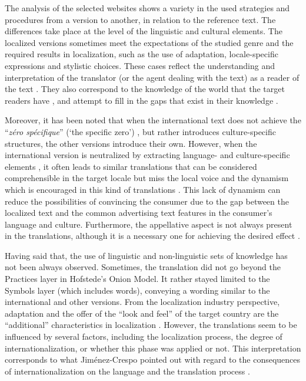 \documentclass[output=paper]{langsci/langscibook}
\begin{document}
The analysis of the selected websites shows a variety in the used strategies and procedures from a version to another, in relation to the reference text. The differences take place at the level of the linguistic and cultural elements. The localized versions sometimes meet the expectations of the studied genre and the required results in localization, such as the use of adaptation, locale-specific expressions and stylistic choices. These cases reflect the understanding and interpretation of the translator (or the agent dealing with the text) as a reader of the text \parencite{plassard07}. They also correspond to the knowledge of the world that the target readers have \parencite[96]{nord05}, and attempt to fill in the gaps that exist in their knowledge \parencite{baker11}.

Moreover, it has been noted that when the international text does not achieve the \enquote{\itshape zéro spécifique} (`the specific zero') \parencite{gouadec03}, but rather introduces cul\-ture-specific structures, the other versions introduce their own. However, when the international version is neutralized by extracting language- and culture-spe\-cif\-ic elements \parencite{schaeler07}, it often leads to similar translations that can be considered comprehensible in the target locale but miss the local voice and the dynamism which is encouraged in this kind of translations \parencite{tatilon90}. This lack of dynamism can reduce the possibilities of convincing the consumer due to the gap between the localized text and the common advertising text features in the consumer’s language and culture. Furthermore, the appellative aspect \parencite{nord05} is not always present in the translations, although it is a necessary one for achieving the desired effect \parencite{ladmiral14}.

Having said that, the use of linguistic and non-linguistic sets of knowledge has not been always observed. Sometimes, the translation did not go beyond the Practices layer in Hofstede's Onion Model. It rather stayed limited to the Symbols layer (which includes words), conveying a wording similar to the international and other versions. From the localization industry perspective, adaptation and the offer of the \enquote{look and feel} of the target country are the \enquote{additional} characteristics in localization \parencite[15]{jimenez13}. However, the translations seem to be influenced by several factors, including the localization process, the degree of internationalization, or whether this phase was applied or not. This interpretation corresponds to what Jiménez-Crespo pointed out with regard to the consequences of internationalization on the language and the translation process \parencite*[10]{jimenez13}.
\end{document}
